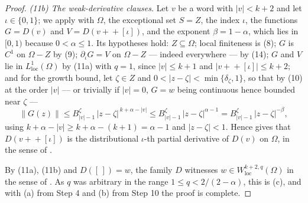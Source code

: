\begin{proof}
\emph{(11b) The weak-derivative clauses.}  Let $v$ be a word with $|v|<k+2$ and
let $\iota\in\{0,1\}$; we apply  with
$\Omega$, the exceptional set $S=Z$, the index $\iota$, the functions
$G=D(v)$ and $V=D(v+\!\!+[\iota])$, and the exponent $\beta=1-\alpha$, which lies
in $[0,1)$ because $0<\alpha\le1$.  Its hypotheses hold:
$Z\subseteq\Omega$; local finiteness is (8); $G$ is $C^{1}$ on $\Omega-Z$ by
(9); $\partial_\iota G=V$ on $\Omega-Z$ --- indeed everywhere --- by (14); $G$ and
$V$ lie in $L^{1}_{\mathrm{loc}}(\Omega)$ by (11a) with $q=1$, since
$|v|\le k+1$ and $|v+\!\!+[\iota]|\le k+2$; and for the growth bound, let
$\zeta\in Z$ and $0<|z-\zeta|<\min\{\delta_\zeta,1\}$, so that by (10) at the
order $|v|$ --- or trivially if $|v|=0$, $G=w$ being continuous hence bounded
near $\zeta$ ---
\[
  \|G(z)\|\le B^{\zeta}_{|v|-1}\,|z-\zeta|^{\,k+\alpha-|v|}
  \le B^{\zeta}_{|v|-1}\,|z-\zeta|^{\alpha-1}
  =B^{\zeta}_{|v|-1}\,|z-\zeta|^{-\beta},
\]
using $k+\alpha-|v|\ge k+\alpha-(k+1)=\alpha-1$ and $|z-\zeta|<1$.  Hence
 gives that $D(v+\!\!+[\iota])$ is the
distributional $\iota$-th partial derivative of $D(v)$ on $\Omega$, in the sense
of .

By (11a), (11b) and $D([\,])=w$, the family $D$ witnesses
$w\in W^{k+2,q}_{\mathrm{loc}}(\Omega)$ in the sense of .
As $q$ was arbitrary in the range $1\le q<2/(2-\alpha)$, this is (c), and with
(a) from Step 4 and (b) from Step 10 the proof is complete.
\end{proof}
